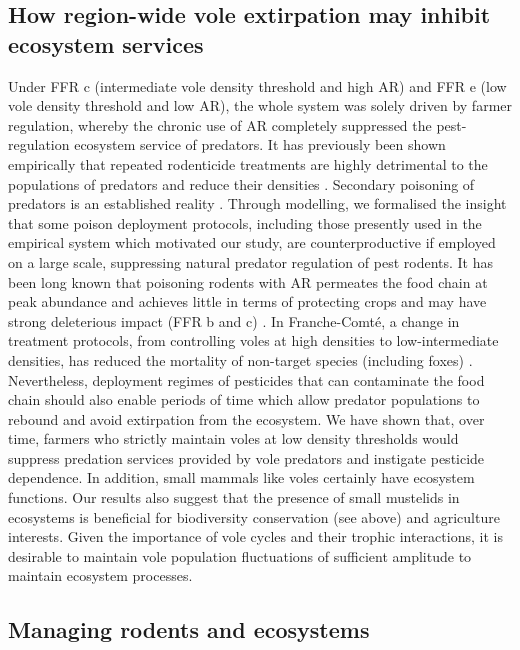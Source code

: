 \documentclass[11pt]{article}
\begin{document}
\subsection{How region-wide vole extirpation may inhibit ecosystem services}

Under FFR c (intermediate vole density threshold and high AR) and FFR e (low vole density threshold and low AR), the whole system was solely driven by farmer regulation, whereby the chronic use of AR completely suppressed the pest-regulation ecosystem service of predators. It has previously been shown empirically that repeated rodenticide treatments are highly detrimental to the populations of predators and reduce their densities  
\citep{Jacquot2013}. Secondary poisoning of predators is an established reality \citep{Berny2007}.  Through modelling, we formalised the insight that some poison deployment protocols, including those presently used in the empirical system which motivated our study, are counterproductive if employed on a large scale, suppressing natural predator regulation of pest rodents. It has been long known that poisoning rodents with AR permeates the food chain at peak abundance and achieves little in terms of protecting crops and may have strong deleterious impact (FFR b and c) \citep{Olea2009}. In Franche-Comté, a change in treatment protocols, from controlling voles at high densities to low-intermediate densities, has reduced the mortality of non-target species (including foxes) \citep{Jacquot2013}. Nevertheless, deployment regimes of pesticides that can contaminate the food chain should also enable periods of time which allow predator populations to rebound and avoid extirpation from the ecosystem. We have shown that, over time, farmers who strictly maintain voles at low density thresholds would suppress predation services provided by vole predators and instigate pesticide dependence. In addition, small mammals like voles certainly have ecosystem functions. Our results also suggest that the presence of small mustelids in ecosystems is beneficial for biodiversity conservation (see above) and agriculture interests. Given the importance of vole cycles and their trophic interactions, it is desirable to maintain vole population fluctuations of sufficient amplitude to maintain ecosystem processes.

\subsection{Managing rodents and ecosystems}
\end{document}
